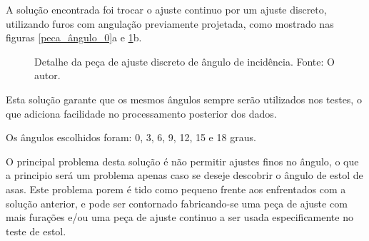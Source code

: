 A solução encontrada foi trocar o ajuste continuo por um ajuste discreto, utilizando furos com angulação previamente projetada, como mostrado nas figuras \ref{peca_ângulo_0}a e \ref{peca_ângulo_18}b.

\begin{figure}[!ht]
    \centering
    \caption{Detalhe da peça de ajuste discreto de ângulo de incidência. Fonte: O autor.}
        \label{peca_ângulo_0}
        \qquad
        \label{peca_ângulo_18}
\end{figure}

Esta solução garante que os mesmos ângulos sempre serão utilizados nos testes, o que adiciona facilidade no processamento posterior dos dados.

Os ângulos escolhidos foram: 0, 3, 6, 9, 12, 15 e 18 graus.

O principal problema desta solução é não permitir ajustes finos no ângulo, o que a principio será um problema apenas caso se deseje descobrir o ângulo de estol de asas. Este problema porem é tido como pequeno frente aos enfrentados com a solução anterior, e pode ser contornado fabricando-se uma peça de ajuste com mais furações e/ou uma peça de ajuste continuo a ser usada especificamente no teste de estol.
